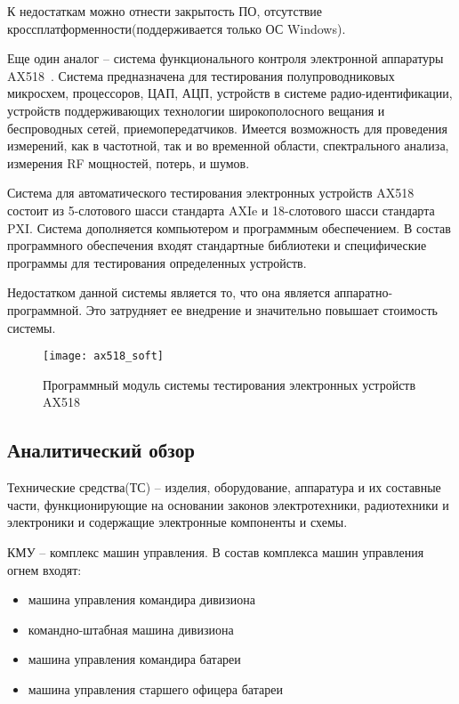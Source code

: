 К недостаткам можно отнести закрытость ПО, отсутствие кроссплатформенности(поддерживается только ОС Windows).

Еще один аналог -- система функционального контроля электронной аппаратуры AX518~\cite{AX518}. Система предназначена для тестирования полупроводниковых микросхем, процессоров, ЦАП, АЦП, устройств в системе радио-идентификации, устройств поддерживающих технологии широкополосного вещания и беспроводных сетей, приемопередатчиков.
Имеется возможность для проведения измерений, как в частотной, так и во временной области, спектрального анализа, измерения RF мощностей, потерь, и шумов.

Система для автоматического тестирования электронных устройств AX518 состоит из 5-слотового шасси стандарта AXIe и 18-слотового шасси стандарта PXI.
Система дополняется компьютером и программным обеспечением.
В состав программного обеспечения входят стандартные библиотеки и специфические программы для тестирования определенных устройств.

Недостатком данной системы является то, что она является аппаратно-программной. Это затрудняет ее внедрение и
значительно повышает стоимость системы.

\begin{figure}[ht]
	\centering
	\texttt{[image: ax518\_soft]}
	\caption{Программный модуль системы тестирования электронных устройств AX518~\cite{AX518}}
	\label{fig:lit_reiview:analogues:ax518_soft}
\end{figure}

\subsection{Аналитический обзор}
\label{sub:lit_review:analitics}
Технические средства(ТС) --  изделия, оборудование, аппаратура и их составные части, функционирующие на основании законов электротехники, радиотехники и электроники и содержащие электронные компоненты и схемы.

КМУ -- комплекс машин управления.
В состав комплекса машин управления огнем входят:
\begin{itemize}
	\item машина управления командира дивизиона~\cite{div_car}
	\item командно-штабная машина дивизиона
	\item машина управления командира батареи
	\item машина управления старшего офицера батареи
\end{itemize}

